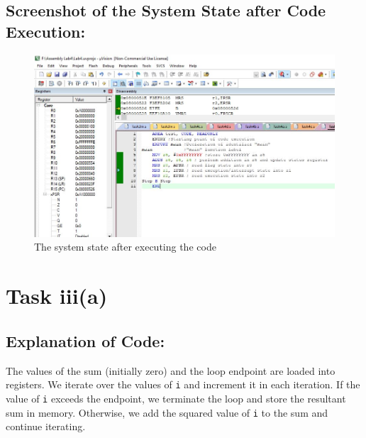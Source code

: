 \documentclass[12pt]{article}
\begin{document}
 \subsection{Screenshot of the System State after Code Execution:}
 \begin{figure}[ht]
     \centering
     \includegraphics[scale=.7]{images/aftertask2.JPG}
     \caption{The system state after executing the code}
     \label{fig:after_task_two}
 \end{figure}
 \pagebreak
\section{Task iii(a)}
\subsection{Explanation of Code:}
The values of the sum (initially zero) and the loop endpoint are loaded into registers. We iterate over the values of \verb|i| and increment it in each iteration. If the value of \verb|i| exceeds the endpoint, we terminate the loop and store the resultant sum in memory. Otherwise, we add the squared value of \verb|i| to the sum and continue iterating.
\end{document}
